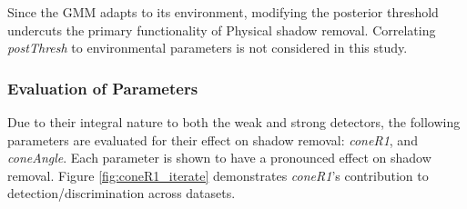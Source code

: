 \documentclass[12pt]{report}
\begin{document}
Since the GMM adapts to its environment, modifying the posterior threshold undercuts the primary functionality of Physical shadow removal. Correlating \textit{postThresh} to environmental parameters is not considered in this study.

\subsubsection{Evaluation of Parameters}

Due to their integral nature to both the weak and strong detectors, the following parameters are evaluated for their effect on shadow removal: \textit{coneR1}, and \textit{coneAngle}. Each parameter is shown to have a pronounced effect on shadow removal. Figure \ref{fig:coneR1_iterate} demonstrates \textit{coneR1}'s contribution to detection/discrimination across datasets.
\end{document}
